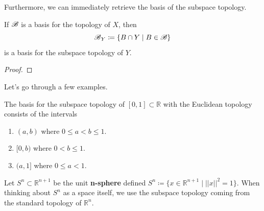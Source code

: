   Furthermore, we can immediately retrieve the basis of the subspace topology. 

  \begin{theorem}
    If $\operatorname{\mathscr{B}}$ is a basis for the topology of $X$, then 
    \begin{equation}
      \operatorname{\mathscr{B}}_Y \coloneqq \{B \cap Y \mid B \in \operatorname{\mathscr{B}} \} 
    \end{equation}
    is a basis for the subspace topology of $Y$. 
  \end{theorem}
  \begin{proof}
    
  \end{proof}

  Let's go through a few examples. 

  \begin{example}
    The basis for the subspace topology of $[0, 1] \subset \mathbb{R}$ with the Euclidean topology consists of the intervals 
    \begin{enumerate}
      \item $(a, b)$ where $0 \leq a < b \leq 1$. 
      \item $[0, b)$ where $0 < b \leq 1$. 
      \item $(a, 1]$ where $0 \leq a < 1$. 
    \end{enumerate}
  \end{example} 

  \begin{example} 
    Let $S^n \subset \mathbb{R}^{n+1}$ be the unit \textbf{n-sphere} defined $S^n \coloneqq \{x \in \mathbb{R}^{n+1} \mid ||x||^2 = 1 \}$. When thinking about $S^n$ as a space itself, we use the subspace topology coming from the standard topology of $\mathbb{R}^n$. 
  \end{example}

